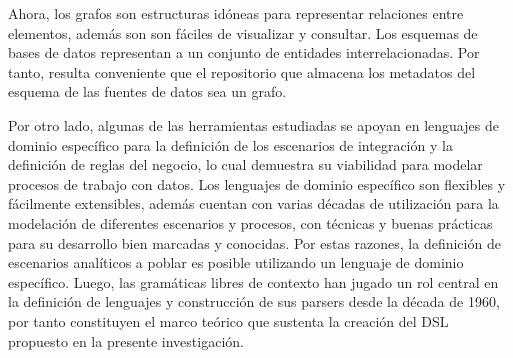 Ahora, los grafos son estructuras idóneas para representar relaciones entre elementos, además son son f\'aciles 
de visualizar y consultar. Los esquemas de bases de 
datos representan a un conjunto de entidades interrelacionadas. Por tanto, resulta conveniente que el repositorio 
que almacena los metadatos del esquema de las fuentes de datos sea un grafo.

Por otro lado, algunas de las herramientas estudiadas se apoyan en lenguajes de dominio específico para la definición 
de los escenarios de integración y la definición de reglas del negocio, lo cual demuestra su viabilidad para modelar 
procesos de trabajo con datos. Los lenguajes de dominio específico son flexibles y fácilmente extensibles, además 
cuentan con varias décadas de utilización para la modelación de diferentes escenarios y procesos, con técnicas y 
buenas prácticas para su desarrollo bien marcadas y conocidas. Por estas razones, la definición de escenarios 
analíticos a poblar es posible utilizando un lenguaje de dominio específico. Luego, las gramáticas libres de 
contexto han jugado un rol central en la definición de lenguajes y construcción de sus parsers desde la década 
de 1960\cite{hopcroft_introduction_2007}, por tanto constituyen el marco teórico que sustenta la creación 
del DSL propuesto en la presente investigación.
